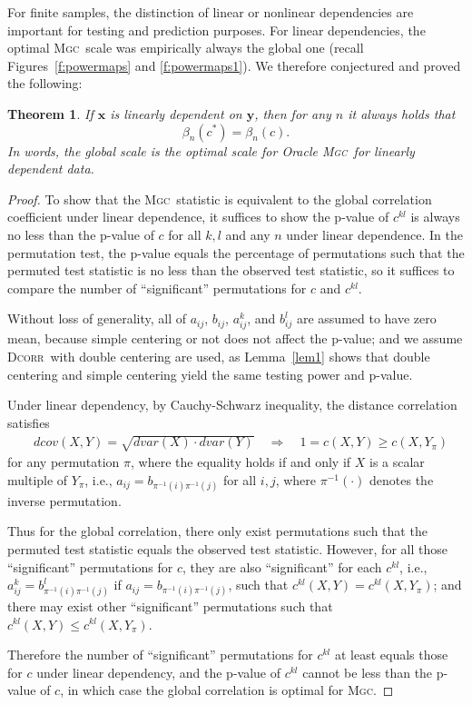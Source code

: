 \documentclass[11pt]{article}
\providecommand{\sct}[1]{{\normalfont\textsc{#1}}}
\providecommand{\mb}[1]{\boldsymbol{#1}}
\newcommand{\GG}{c}
\newcommand{\Mgc}{\sct{Mgc}}
\newcommand{\Dcorr}{\sct{Dcorr}}
\newtheorem{thm}{Theorem}
\begin{document}
For finite samples, the distinction of linear or nonlinear dependencies are important for testing and prediction purposes.
For linear dependencies,  the optimal \Mgc~scale was empirically always the global one (recall Figures~\ref{f:powermaps} and \ref{f:powermaps1}). We therefore conjectured and proved the following:
\begin{thm}
\label{t:linear}
If $\mb{x}$ is linearly dependent on $\mb{y}$, then for any $n$ it always holds that
\begin{equation}
\beta_n(\GG^*) = \beta_n(\GG).
\end{equation}
In words, the global scale is the optimal scale for Oracle \Mgc~for linearly dependent data.
\end{thm}
\begin{proof}
To show that the \Mgc~statistic is equivalent to the global correlation coefficient under linear dependence, it suffices to show the p-value of $\GG^{kl}$ is always no less than the p-value of $\GG$ for all $k,l$ and any $n$ under linear dependence. In the permutation test, the p-value equals the percentage of permutations such that the permuted test statistic is no less than the observed test statistic, so it suffices to compare the number of ``significant'' permutations for $\GG$ and $\GG^{kl}$.

Without loss of generality, all of $a_{ij}$, $b_{ij}$, $a_{ij}^{k}$, and $b_{ij}^{l}$ are assumed to have zero mean, because simple centering or not does not affect the p-value; and we assume \Dcorr~with double centering are used, as Lemma~\ref{lem1} shows that double centering and simple centering yield the same testing power and p-value.

Under linear dependency, by Cauchy-Schwarz inequality, the distance correlation satisfies
\begin{align*}
& dcov(X,Y) = \sqrt{dvar(X) \cdot dvar(Y)} \quad\Rightarrow\quad 1=\GG(X, Y) \geq \GG(X, Y_{\pi})
\end{align*}
for any permutation $\pi$, where the equality holds if and only if $X$ is a scalar multiple of $Y_{\pi}$, i.e., $a_{ij}=b_{\pi^{-1}(i) \pi^{-1}(j)}$ for all $i,j$, where $\pi^{-1}(\cdot)$ denotes the inverse permutation. 

Thus for the global correlation, there only exist permutations such that the permuted test statistic equals the observed test statistic. However, for all those ``significant'' permutations for $\GG$, they are also ``significant'' for each $\GG^{kl}$, i.e., $a_{ij}^{k}=b_{\pi^{-1}(i) \pi^{-1}(j)}^{l}$ if $a_{ij}=b_{\pi^{-1}(i) \pi^{-1}(j)}$, such that $\GG^{kl}(X, Y)=\GG^{kl}(X, Y_{\pi})$; and there may exist other ``significant'' permutations such that $\GG^{kl}(X, Y) \leq \GG^{kl}(X, Y_{\pi})$.

Therefore the number of ``significant'' permutations for $\GG^{kl}$ at least equals those for $\GG$ under linear dependency, and the p-value of $\GG^{kl}$ cannot be less than the p-value of $\GG$, in which case the global correlation is optimal for \Mgc. 
\end{proof}
\end{document}
